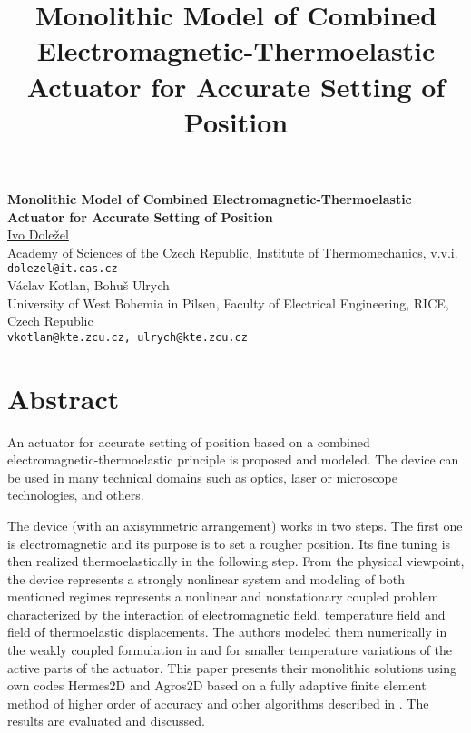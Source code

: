 \title{Monolithic Model of Combined Electromagnetic-Thermoelastic Actuator for Accurate Setting of Position}
\author{} \institute{}
\tocauthor{}

\begin{center}

\textbf{\Large Monolithic Model of Combined Electromagnetic-Thermoelastic Actuator for Accurate Setting of Position}\\
\vspace{10mm}
{\large \underline{Ivo Dole\v{z}el}}\\
Academy of Sciences of the Czech Republic, Institute of Thermomechanics, v.v.i.\\
{\tt dolezel@it.cas.cz}
\vspace{4mm}\\
{\large V\'{a}clav Kotlan, Bohu\v{s} Ulrych}\\
University of West Bohemia in Pilsen, Faculty of Electrical Engineering, RICE,
Czech Republic\\
{\tt vkotlan@kte.zcu.cz, ulrych@kte.zcu.cz}\\

\end{center}

\section*{Abstract}

An actuator for accurate setting of position based on a combined electromagnetic-thermoelastic principle is proposed and modeled. The device can be used in many technical domains such as optics, laser or microscope technologies, and others.

The device (with an axisymmetric arrangement) works in two steps. The first one is electromagnetic and its purpose is to set a rougher position. Its fine tuning is then realized thermoelastically in the following step. From the physical viewpoint, the device represents a strongly nonlinear system and modeling of both mentioned regimes represents a nonlinear and nonstationary coupled problem characterized by the interaction of electromagnetic field, temperature field and field of thermoelastic displacements. The authors modeled them numerically in the weakly coupled formulation in \cite{EPNC} and \cite{Przeglad} for smaller
temperature variations of the active parts of the actuator. This paper presents their monolithic solutions using own codes Hermes2D and Agros2D \cite{Hermes2D} based on a fully adaptive finite element method of higher order of accuracy and other algorithms described in \cite{Solin}. The results are evaluated and discussed.

